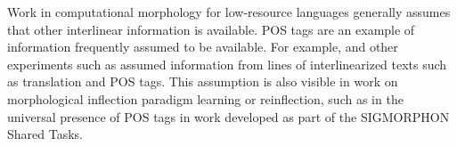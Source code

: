 Work in computational morphology for low-resource languages generally assumes that other interlinear information is available. POS tags are an example of information frequently assumed to be available. For example, 
\citet{mcmillan-major_automating_2020} and other experiments such as \citet{samardzic_automatic_2015} assumed information from lines of interlinearized texts such as translation and POS tags. This assumption is also visible in work on morphological inflection paradigm learning or reinflection, such as in the universal presence of POS tags in work developed as part of the SIGMORPHON Shared Tasks.
